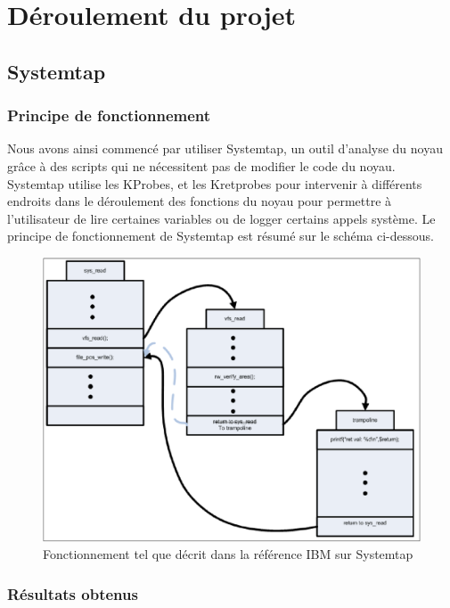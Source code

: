 \section{Déroulement du projet}

\subsection{Systemtap}

\subsubsection{Principe de fonctionnement}

Nous avons ainsi commencé par utiliser Systemtap, un outil d'analyse du noyau grâce à des scripts qui ne nécessitent pas de modifier le code du noyau. Systemtap utilise les KProbes, et les Kretprobes\cite{IBMRBST} pour intervenir à différents endroits dans le déroulement des fonctions du noyau pour permettre à l'utilisateur de lire certaines variables ou de logger certains appels système. Le principe de fonctionnement de Systemtap est résumé sur le schéma ci-dessous.

\begin{figure}[hb]
	\centering
	\includegraphics[scale=0.4]{kretprob.png}
	\caption{Fonctionnement tel que décrit dans la référence IBM sur Systemtap \cite{IBMRBST}}
\end{figure}

\subsubsection{Résultats obtenus}

